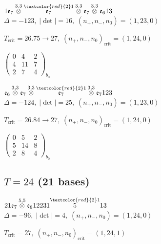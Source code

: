 \documentclass[10pt]{article}
\begin{document}
\smallskip

$1\mathfrak{e}_7\overset{3,3}{\otimes}\overset{\textcolor{red}{2}1}{\mathfrak{e}_7}\overset{3,3}{\otimes}\mathfrak{e}_7\overset{3,3}{\otimes}\mathfrak{e}_613$ \quad $\Delta=-123,\; |\det|=16,\; (n_+,n_-,n_0)=(1,23,0)$

\hspace{1em}$T_{\text{crit}}=26.75 \to 27,\; (n_+,n_-,n_0)_{\text{crit}}=(1,24,0)$

\hspace{2em}$\left(\begin{smallmatrix}0 & 4 & 2 \\ 4 & 11 & 7 \\ 2 & 7 & 4\end{smallmatrix}\right)_{\!b_0}$

\smallskip

$\mathfrak{e}_6\overset{3,3}{\otimes}\mathfrak{e}_7\overset{3,3}{\otimes}\overset{\textcolor{red}{2}1}{\mathfrak{e}_7}\overset{3,3}{\otimes}\mathfrak{e}_7123$ \quad $\Delta=-124,\; |\det|=25,\; (n_+,n_-,n_0)=(1,23,0)$

\hspace{1em}$T_{\text{crit}}=26.84 \to 27,\; (n_+,n_-,n_0)_{\text{crit}}=(1,24,0)$

\hspace{2em}$\left(\begin{smallmatrix}0 & 5 & 2 \\ 5 & 14 & 8 \\ 2 & 8 & 4\end{smallmatrix}\right)_{\!b_0}$


\subsection*{$T = 24$ \quad (21 bases)}
\smallskip

$21\mathfrak{e}_7\overset{5,5}{\otimes}\mathfrak{e}_812231\overset{\textcolor{red}{2}1}{5}13$ \quad $\Delta=-96,\; |\det|=4,\; (n_+,n_-,n_0)=(1,24,0)$

\hspace{1em}$T_{\text{crit}}=27,\; (n_+,n_-,n_0)_{\text{crit}}=(1,24,1)$
\end{document}
